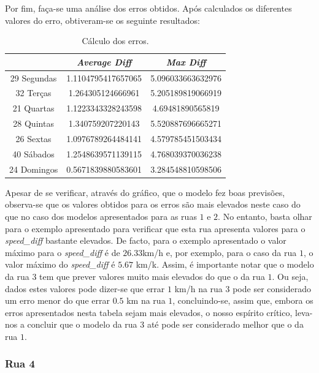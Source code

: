 \documentclass[a4paper, 12pt]{article}
\begin{document}
Por fim, faça-se uma análise dos erros obtidos. Após calculados os diferentes valores do erro, obtiveram-se os seguinte resultados:

\begin{table}[H]
	\centering
	\begin{tabular}{||c||c|c||}
		\hline\hline
		& \textit{Average Diff} & \textit{Max Diff} \\
		\hline\hline
		29 Segundas & 
1.1104795417657065
 & 5.096033663632976\\
		\hline
		32 Terças  &

1.264305124666961 & 5.205189819066919 \\
		\hline
		21 Quartas & 
1.1223343328243598
 & 4.69481890565819 \\
		\hline
		28 Quintas  & 
1.340759207220143
 & 5.520887696665271\\
		\hline
		26 Sextas & 1.0976789264484141
 & 4.579785451503434\\
		\hline
		40 Sábados  & 
1.2548639571139115& 4.768039370036238 \\
		\hline
		24 Domingos & 
0.5671839880583601
 & 
3.284548810598506 \\
		\hline\hline
	\end{tabular}
	\label{table:rua3}
	\caption{Cálculo dos erros.}
\end{table}

Apesar de se verificar, através do gráfico, que o modelo fez boas previsões, observa-se que os valores obtidos para os erros são mais elevados neste caso do que no caso dos modelos apresentados para as ruas $1$ e $2$. No entanto, basta olhar para o exemplo apresentado para verificar que esta rua apresenta valores para o \textit{speed\_diff} bastante elevados. De facto, para o exemplo apresentado o valor máximo para o \textit{speed\_diff} é de $26.33$km/h e, por exemplo, para o caso da rua $1$, o valor máximo do \textit{speed\_diff} é $5.67$ km/k. Assim, é importante notar que o modelo da rua $3$ tem que prever valores muito mais elevados do que o da rua $1$. Ou seja, dados estes valores pode dizer-se que errar $1$ km/h na rua $3$ pode ser considerado um erro menor do que errar $0.5$ km na rua $1$, concluindo-se, assim que, embora os erros apresentados nesta tabela sejam mais elevados, o nosso espírito crítico, leva-nos a concluir que o modelo da rua $3$ até pode ser considerado melhor que o da rua $1$.

\subsubsection{Rua 4}
\end{document}

